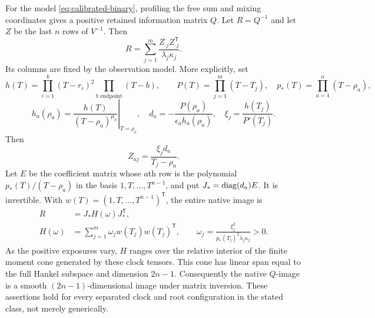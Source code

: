 \begin{theorem}\label{thm:binary-hankel}
For the model \eqref{eq:calibrated-binary}, profiling the free sum and
mixing coordinates gives a positive retained information matrix $Q$.
Let $R=Q^{-1}$ and let $Z$ be the last $n$ rows of $V^{-1}$. Then
\begin{equation}\label{eq:native-inverse}
 R=\sum_{j=1}^m\frac{Z_{\cdot j}Z_{\cdot j}^{\mathsf T}}
                            {\lambda_j\kappa_j}.
\end{equation}
Its columns are fixed by the observation model. More explicitly, set
\[
 h(T)=\prod_{i=1}^k(T-r_i)^2\prod_{b\text{ endpoint}}(T-b),\qquad
 P(T)=\prod_{j=1}^m(T-T_j),\quad p_*(T)=\prod_{a=1}^n(T-\rho_a),
\]
\[
 h_a(\rho_a)=\left.\frac{h(T)}{(T-\rho_a)^{\mu_a}}\right|_{T=\rho_a},
 \quad d_a=-\frac{P(\rho_a)}{\epsilon_a h_a(\rho_a)},\quad
 \xi_j=\frac{h(T_j)}{P'(T_j)}.
\]
Then
\begin{equation}\label{eq:cauchy-columns}
 Z_{aj}=\frac{\xi_j d_a}{T_j-\rho_a}.
\end{equation}
Let $E$ be the coefficient matrix whose $a$th row is the polynomial
$p_*(T)/(T-\rho_a)$ in the basis $1,T,\ldots,T^{n-1}$, and put
$J_* =\operatorname{diag}(d_a)E$. It is invertible. With
$w(T)=(1,T,\ldots,T^{n-1})^{\mathsf T}$, the entire native image is
\begin{equation}\label{eq:hankel-cone}
 \begin{split}
 R&=J_*H(\omega)J_*^{\mathsf T},\\
 H(\omega)&=\sum_{j=1}^m\omega_j w(T_j)w(T_j)^{\mathsf T},\qquad
 \omega_j=\frac{\xi_j^2}{p_*(T_j)^2\lambda_j\kappa_j}>0.
 \end{split}
\end{equation}
As the positive exposures vary, $H$ ranges over the relative interior of
the finite moment cone generated by these clock tensors. This cone has
linear span equal to the full Hankel subspace and dimension $2n-1$.
Consequently the native $Q$-image is a smooth $(2n-1)$-dimensional image
under matrix inversion. These assertions hold for every separated clock
and root configuration in the stated class, not merely generically.
\end{theorem}
